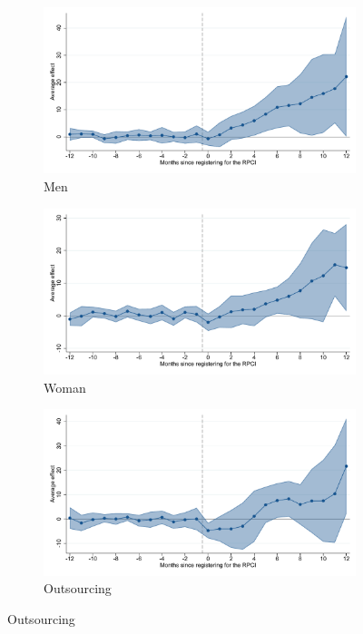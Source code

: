 \begin{figure}[H]
    \centering
    \caption{Event studies - RPCI effect on wage}
    
    \begin{subfigure}{0.32\textwidth}
    \caption{Men}
    \includegraphics[width=\textwidth]{04_Figures/muestra_10porciento/event_study_sal_cierre_hombre_dcdh_connected.pdf}
    \end{subfigure}
    \begin{subfigure}{0.32\textwidth}
    \caption{Woman}
    \includegraphics[width=\textwidth]{04_Figures/muestra_10porciento/event_study_sal_cierre_mujer_dcdh_connected.pdf}
    \end{subfigure}
    \begin{subfigure}{0.32\textwidth}
    \caption{Outsourcing}
    \includegraphics[width=\textwidth]{04_Figures/muestra_10porciento/event_study_sal_cierre_base_outsourcing_dcdh_connected.pdf}
    \end{subfigure}
    

\end{figure}
